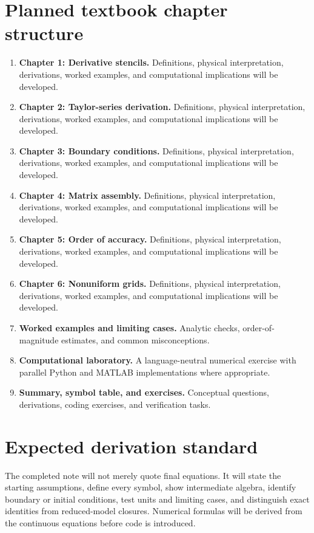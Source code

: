 \documentclass[11pt]{article}
\begin{document}
\section{Planned textbook chapter structure}
\begin{enumerate}[leftmargin=1.8em]
\item \textbf{Chapter 1: Derivative stencils.} Definitions, physical interpretation, derivations, worked examples, and computational implications will be developed.
\item \textbf{Chapter 2: Taylor-series derivation.} Definitions, physical interpretation, derivations, worked examples, and computational implications will be developed.
\item \textbf{Chapter 3: Boundary conditions.} Definitions, physical interpretation, derivations, worked examples, and computational implications will be developed.
\item \textbf{Chapter 4: Matrix assembly.} Definitions, physical interpretation, derivations, worked examples, and computational implications will be developed.
\item \textbf{Chapter 5: Order of accuracy.} Definitions, physical interpretation, derivations, worked examples, and computational implications will be developed.
\item \textbf{Chapter 6: Nonuniform grids.} Definitions, physical interpretation, derivations, worked examples, and computational implications will be developed.
\item \textbf{Worked examples and limiting cases.} Analytic checks, order-of-magnitude estimates, and common misconceptions.
\item \textbf{Computational laboratory.} A language-neutral numerical exercise with parallel Python and MATLAB implementations where appropriate.
\item \textbf{Summary, symbol table, and exercises.} Conceptual questions, derivations, coding exercises, and verification tasks.
\end{enumerate}

\section{Expected derivation standard}
The completed note will not merely quote final equations. It will state the starting assumptions, define every symbol, show intermediate algebra, identify boundary or initial conditions, test units and limiting cases, and distinguish exact identities from reduced-model closures. Numerical formulas will be derived from the continuous equations before code is introduced.
\end{document}
